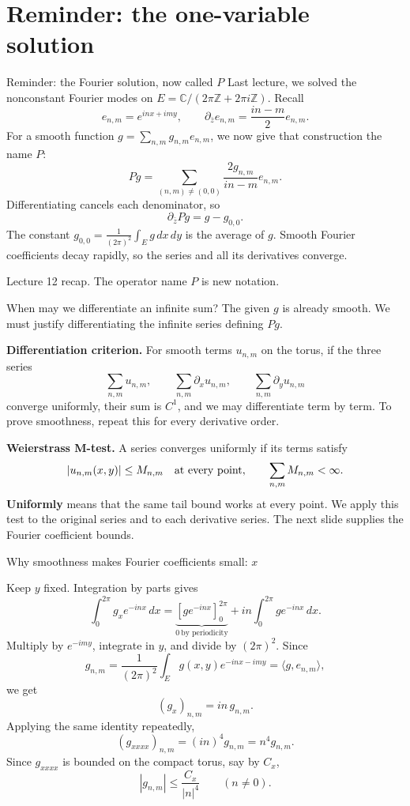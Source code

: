 \documentclass[aspectratio=169,11pt]{beamer}
\newcommand{\C}{\mathbb C}
\newcommand{\Z}{\mathbb Z}
\newcommand{\src}[1]{\par\vfill{\scriptsize #1\par}}
\begin{document}
\section{Reminder: the one-variable solution}

\begin{frame}{Reminder: the Fourier solution, now called $P$}
Last lecture, we solved the nonconstant Fourier modes on
$E=\C/(2\pi\Z+2\pi i\Z)$. Recall
\[
 e_{n,m}=e^{inx+imy},\qquad
 \partial_{\bar z}e_{n,m}=\frac{in-m}{2}e_{n,m}.
\]
For a smooth function $g=\sum_{n,m}g_{n,m}e_{n,m}$, we now give that
construction the name $P$:
\[
 Pg=\sum_{(n,m)\ne(0,0)}\frac{2g_{n,m}}{in-m}e_{n,m}.
\]
Differentiating cancels each denominator, so
\[
 \boxed{\partial_{\bar z}Pg=g-g_{0,0}.}
\]
The constant $g_{0,0}=\frac{1}{(2\pi)^2}\int_E g\,dx\,dy$ is the average of $g$.
Smooth Fourier coefficients decay rapidly, so the series and all its
derivatives converge.
\src{Lecture 12 recap. The operator name $P$ is new notation.}
\end{frame}

\begin{frame}{When may we differentiate an infinite sum?}
\setlength{\parskip}{3pt}
\setlength{\abovedisplayskip}{4pt}
\setlength{\belowdisplayskip}{4pt}
The given $g$ is already smooth. We must justify differentiating
the infinite series defining $Pg$.

\textbf{Differentiation criterion.}
For smooth terms $u_{n,m}$ on the torus, if the three series
\[
 \sum_{n,m}u_{n,m},\qquad
 \sum_{n,m}\partial_xu_{n,m},\qquad
 \sum_{n,m}\partial_yu_{n,m}
\]
converge uniformly, their sum is $C^1$, and we may differentiate term by term.
To prove smoothness, repeat this for every derivative order.

\textbf{Weierstrass M-test.}
A series converges uniformly if its terms satisfy
\[
 |u_{n,m}(x,y)|\le M_{n,m}\quad\hbox{at every point},\qquad
 \sum_{n,m}M_{n,m}<\infty.
\]
\textbf{Uniformly} means that the same tail bound works at every point.
We apply this test to the original series and to each derivative series.
The next slide supplies the Fourier coefficient bounds.
\end{frame}

\begin{frame}{Why smoothness makes Fourier coefficients small: $x$}
\setlength{\abovedisplayskip}{4pt}
\setlength{\belowdisplayskip}{4pt}

Keep $y$ fixed. Integration by parts gives
\[
 \int_0^{2\pi}g_x e^{-inx}\,dx
 =\underbrace{[g e^{-inx}]_0^{2\pi}}_{0\ \text{by periodicity}}
   +in\int_0^{2\pi}g e^{-inx}\,dx.
\]
Multiply by $e^{-imy}$, integrate in $y$, and divide by $(2\pi)^2$.
Since
\[
g_{n,m}=\frac{1}{(2\pi)^2}\int_E g(x,y)e^{-inx-imy}
       =\langle g,e_{n,m}\rangle,
\]
we get
\[
(g_x)_{n,m}=in\,g_{n,m}.
\]
Applying the same identity repeatedly,
\[
\boxed{(g_{xxxx})_{n,m}=(in)^4g_{n,m}=n^4g_{n,m}.}
\]
Since $g_{xxxx}$ is bounded on the compact torus, say by $C_x$,
\[
\boxed{|g_{n,m}|\le \frac{C_x}{|n|^4}\qquad(n\ne0).}
\]
\end{frame}
\end{document}
